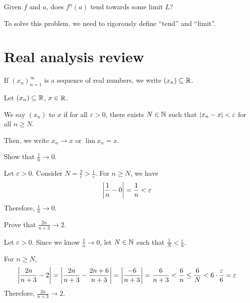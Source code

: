 \documentclass[class=pmath370,tikz,notes]{agony}
\begin{document}
\begin{problem}
  Given $f$ and $a$, does $f^n(a)$ tend towards some limit $L$?
\end{problem}

To solve this problem, we need to rigorously define ``tend'' and ``limit''.

\section{Real analysis review}

\begin{notation}
  If $(x_n)_{n=1}^\infty$ is a sequence of real numbers,
  we write $(x_n) \subseteq \mathbb{R}$.
\end{notation}

\begin{defn*}
  Let $(x_n) \subseteq \mathbb{R}$, $x \in \mathbb{R}$.

  We say $(x_n)$  to $x$ if
  for all $\varepsilon > 0$, there exists $N \in \mathbb{N}$
  such that $\abs{x_n - x} < \varepsilon$ for all $n \geq N$.

  Then, we write $x_n \to x$ or $\lim x_n = x$.
\end{defn*}

\begin{example}
  Show that $\frac1n \to 0$.
\end{example}
\begin{prf}
  Let $\varepsilon > 0$. Consider $N = \frac{2}{\varepsilon} > \frac{1}{\varepsilon}$.
  For $n \geq N$, we have
  \[ \abs{\frac1n - 0} = \frac1n < \varepsilon \]
  Therefore, $\frac1n \to 0$.
\end{prf}

\begin{example}
  Prove that $\frac{2n}{n+3} \to 2$.
\end{example}
\begin{prf}
  Let $\varepsilon > 0$.
  Since we know $\frac1n \to 0$,
  let $N \in \mathbb{N}$ such that $\frac1N < \frac{\varepsilon}{6}$.

  For $n \geq N$,
  \begin{align*}
    \abs{\frac{2n}{n+3} - 2} = \abs{\frac{2n}{n+3} - \frac{2n+6}{n+3}}
    = \abs{\frac{-6}{n+3}}
    = \frac{6}{n+3}
    < \frac{6}{n}
    \leq \frac{6}{N}
    < 6\cdot\frac{\varepsilon}{6}
    = \varepsilon
  \end{align*}
  Therefore, $\frac{2n}{n+3} \to 2$.
\end{prf}
\end{document}
